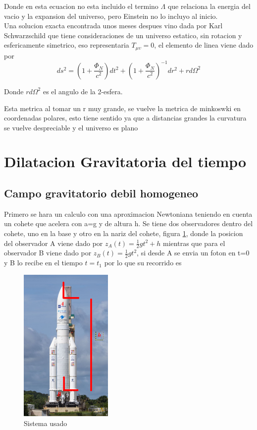 \documentclass[12pt,twoside]{rif}
\begin{document}
Donde en esta ecuacion no esta incluido el termino $\Lambda$ que relaciona la energia del vacio y la expansion del universo, pero Einstein no lo incluyo al inicio.\\
Una solucion exacta encontrada unos meses despues vino dada por Karl Schwarzschild que tiene consideraciones de un universo estatico, sin rotacion y esfericamente simetrico, eso representaria $T_{\mu\upsilon}=0$, el elemento de linea viene dado por
\begin{equation}
ds^{2}=\left(1+\frac{\Phi_{N}}{c^{2}}\right)dt^{2}+\left(1+\frac{\Phi_{N}}{c^{2}}\right)^{-1}dr^{2}+rd\Omega^{2} 
\end{equation}

Donde $rd\Omega^{2}$ es el angulo de la 2-esfera.

Esta metrica al tomar un r muy grande, se vuelve la metrica de minkoswki en  coordenadas polares, esto tiene sentido ya que a distancias grandes la curvatura se vuelve despreciable y el universo es plano

\section{Dilatacion Gravitatoria del tiempo}
	\subsection{Campo gravitatorio debil homogeneo}
	Primero se hara un calculo con una aproximacion Newtoniana teniendo en cuenta un cohete que acelera con a=g y de altura h. Se tiene dos observadores dentro del cohete, uno en la base y otro en la nariz del cohete, figura \ref{fig:cohete}, donde la posicion del observador A viene dado por $z_{A}(t)=\frac{1}{2}gt^{2}+h $ mientras que para el observador B viene dado por $z_{B}(t)=\frac{1}{2}gt^{2}$, si desde A se envia un foton en t=0 y B lo recibe en el tiempo $t=t_{1}$ por lo que su recorrido es

	\begin{figure}[h]
	\centering
	\includegraphics[width=0.4\textwidth]{img/Cohete.png} %
	\caption{Sistema usado}
	\label{fig:cohete}
	\end{figure}
	
\end{document}
